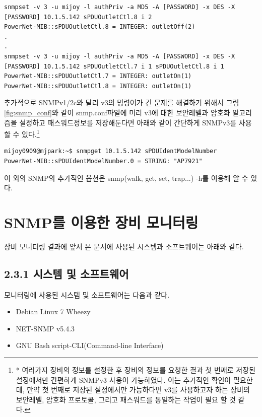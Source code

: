 \documentclass[11pt
  , a4paper
  , article
  , oneside
]{memoir}
\begin{document}
\begin{lstlisting}[style=termstyle]
snmpset -v 3 -u mijoy -l authPriv -a MD5 -A [PASSWORD] -x DES -X [PASSWORD] 10.1.5.142 sPDUOutletCtl.8 i 2
PowerNet-MIB::sPDUOutletCtl.8 = INTEGER: outletOff(2)
.
.
snmpset -v 3 -u mijoy -l authPriv -a MD5 -A [PASSWORD] -x DES -X [PASSWORD] 10.1.5.142 sPDUOutletCtl.7 i 1 sPDUOutletCtl.8 i 1
PowerNet-MIB::sPDUOutletCtl.7 = INTEGER: outletOn(1)
PowerNet-MIB::sPDUOutletCtl.8 = INTEGER: outletOn(1)
\end{lstlisting}

추가적으로 SNMPv1/2c와 달리 v3의 명령어가 긴 문제를 해결하기 위해서 그림 \ref{fig:snmp_conf}와 같이 snmp.conf파일에 미리 v3에 대한 보안레벨과 암호화 알고리즘을 설정하고 패스워드정보를 저장해둔다면 아래와 같이 간단하게 SNMPv3를 사용할 수 있다.\footnote{* 여러가지 장비의 정보를 설정한 후 장비의 정보를 요청한 결과 첫 번째로 저장된 설정에서만 간편하게 SNMPv3 사용이 가능하였다. 이는 추가적인 확인이 필요한데, 만약 첫 번째로 저장된 설정에서만 가능하다면 v3를 사용하고자 하는 장비의 보안레벨, 암호화 프로토콜, 그리고 패스워드를 통일하는 작업이 필요 할 것 같다.}

\begin{lstlisting}[style=termstyle]
mijoy0909@mjpark:~$ snmpget 10.1.5.142 sPDUIdentModelNumber
PowerNet-MIB::sPDUIdentModelNumber.0 = STRING: "AP7921"
\end{lstlisting}

이 외의 SNMP의 추가적인 옵션은 snmp(walk, get, set, trap...) -h를 이용해 알 수 있다.

\clearpage
\section{SNMP를 이용한 장비 모니터링}
장비 모니터링 결과에 앞서 본 문서에 사용된 시스템과 소프트웨어는 아래와 같다.
\subsection{2.3.1 시스템 및 소프트웨어}
모니터링에 사용된 시스템 및 소프트웨어는 다음과 같다.
\begin{itemize}
\item Debian Linux 7 Wheezy
\item NET-SNMP v5.4.3
\item GNU Bash script-CLI(Command-line Interface) 
\end{itemize}
\end{document}
